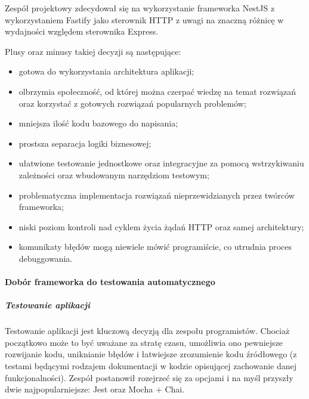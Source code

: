 \documentclass[12pt, a4paper, twoside, openany]{book}
\begin{document}
Zespół projektowy zdecydował się na wykorzystanie frameworka NestJS z wykorzystaniem
Fastify jako sterownik HTTP z uwagi na znaczną różnicę w wydajności względem sterownika Express.

Plusy oraz minusy takiej decyzji są następujące:

\begin{itemize}
    \item gotowa do wykorzystania architektura aplikacji;
    \item olbrzymia społeczność, od której można czerpać wiedzę na temat rozwiązań 
    oraz korzystać z gotowych rozwiązań popularnych problemów;
    \item mniejsza ilość kodu bazowego do napisania;
    \item prostsza separacja logiki biznesowej;
    \item ułatwione testowanie jednostkowe oraz integracyjne za pomocą wstrzykiwaniu
    zależności oraz wbudowanym narzędziom testowym;
    \item problematyczna implementacja rozwiązań nieprzewidzianych przez twórców
    frameworka;
    \item niski poziom kontroli nad cyklem życia żądań HTTP oraz samej architektury;
    \item komunikaty błędów mogą niewiele mówić programiście, co utrudnia proces debuggowania.
\end{itemize}

\paragraph{Dobór frameworka do testowania automatycznego}
\subparagraph{Testowanie aplikacji\\}

Testowanie aplikacji jest kluczową decyzją dla zespołu programistów.
Chociaż początkowo może to być uważane za stratę czasu, umożliwia ono pewniejsze rozwijanie kodu, uniknianie błędów i łatwiejsze zrozumienie kodu źródłowego (z testami będącymi rodzajem dokumentacji w kodzie opisującej zachowanie danej funkcjonalności).
Zespół postanowił rozejrzeć się za opcjami i na myśl przyszły dwie najpopularniejsze: Jest oraz Mocha + Chai.
\end{document}
